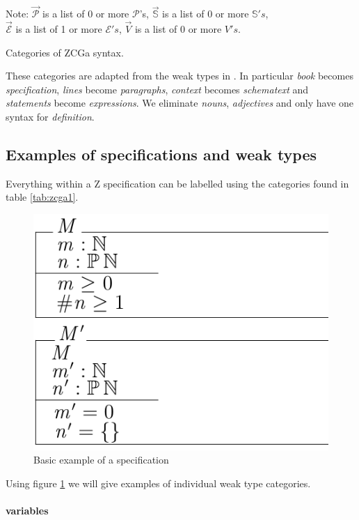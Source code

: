 \begin{table}[H]
Note:
$\overrightarrow{\mathcal{P}}$ is a list of 0 or more $\mathcal{P}$'s, $\overrightarrow{\mathbb{S}}$ is a list of 0 or more $\mathbb{S}'s$,\\
$\overrightarrow{\mathcal{E}}$ is a list of 1 or more $\mathcal{E}'s$, $\overrightarrow{V}$ is a list of 0 or more $V's$.
\caption{Categories of ZCGa syntax.} \label{tab:zcga1}
\end{table}

These categories are adapted from the weak types in \cite{wtt}. In particular \emph{book} becomes \emph{specification}, \emph{lines} become \emph{paragraphs}, \emph{context} becomes \emph{schematext} and \emph{statements} become \emph{expressions}. We eliminate \emph{nouns}, \emph{adjectives} and only have one syntax for \emph{definition}.

\subsection{Examples of specifications and weak types}
Everything within a Z specification can be labelled using the categories found in table \ref{tab:zcga1}.

\begin{figure}[H]
\centering
\includegraphics[scale=0.4]{Figures/zcga/toy.png}
\caption{Basic example of a specification \label{fig:toy}}
\end{figure}

Using figure \ref{fig:toy} we will give examples of individual weak type categories.

\paragraph{variables}
\label{subsubsec:variables}

